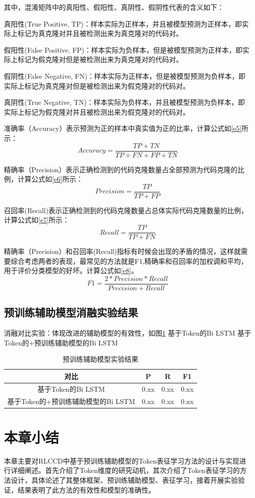 其中，混淆矩阵中的真阳性、假阳性、真阴性、假阴性代表的含义如下：

真阳性(True Positive, TP)：样本实际为正样本，并且被模型预测为正样本，即实际上标记为真克隆对并且被检测出来为真克隆对的代码对。
 
假阳性(False Positive, FP)：样本实际为负样本，但是被模型预测为正样本，即实际上标记为假克隆对但是被检测出来为真克隆对的代码对。
 
假阴性(False Negative, FN)：样本实际为正样本，但是被模型预测为负样本，即实际上标记为真克隆对但是被检测出来为假克隆对的代码对。
 
真阴性(True Negative, TN)：样本实际为负样本，并且被模型预测为负样本，即实际上标记为假克隆对并且被检测出来为假克隆对的代码对。

准确率（Accuracy）表示预测为正的样本中真实值为正的比率，计算公式如\ref{e5}所示：
\begin{equation}\label{e5}
  Accuracy = \frac{TP+TN}{TP+FN+FP+TN} 
\end{equation}

精确率（Precision）表示正确检测到的代码克隆数量占全部预测为代码克隆的比例，计算公式如\ref{e6}所示：
\begin{equation}\label{e6}
  Precision = \frac{TP}{TP+FP} 
\end{equation}

召回率(Recall)表示正确检测到的代码克隆数量占总体实际代码克隆数量的比例，计算公式如\ref{e7}所示：
\begin{equation}\label{e7}
  Recall = \frac{TP}{TP+FN} 
\end{equation}

精确率（Precision）和召回率(Recall)指标有时候会出现的矛盾的情况，这样就需要综合考虑两者的表现，最常见的方法就是F1,精确率和召回率的加权调和平均，用于评价分类模型的好坏。计算公式如\ref{e8}。
\begin{equation}\label{e8}
  F1 = \frac{2*Precision*Recall}{Precision+Recall} 
\end{equation}

\subsection{预训练辅助模型消融实验结果}
消融对比实验：体现改进的辅助模型的有效性，如图\ref{tab:category}
基于Token的Bi LSTM
基于Token的+预训练辅助模型的Bi LSTM

\begin{table}[H]
  \centering
  \caption{预训练辅助模型实验结果} 
  \label{tab:category}
  \begin{tabular*}{0.8\textwidth}{@{\extracolsep{\fill}}cccc}
  \toprule
    对比			&P		&R		&F1 \\
  \midrule
    基于Token的Bi LSTM			&0.xx	&0.xx		&0.xx \\
    基于Token的+预训练辅助模型的Bi LSTM			&0.xx		&0.xx		&0.xx \\
  \bottomrule
  \end{tabular*}
\end{table}

\section{本章小结}
\label{sec:Summary3}
本章主要对RLCCD中基于预训练辅助模型的Token表征学习方法的设计与实现进行详细阐述。首先介绍了Token维度的研究动机，其次介绍了Token表征学习的方法设计，具体论述了其整体框架、预训练辅助模型、表征学习，接着开展实验验证，结果表明了此方法的有效性和模型的准确性。

